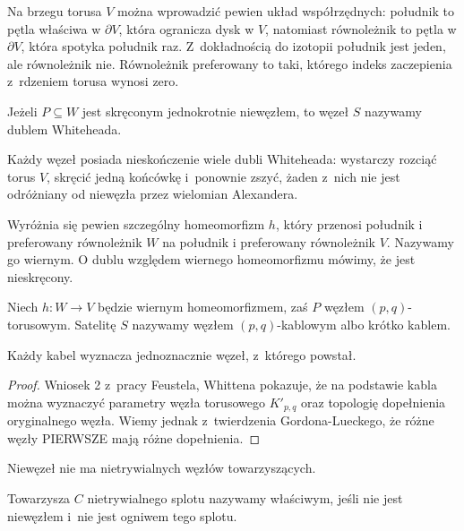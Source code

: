 Na brzegu torusa $V$ można wprowadzić pewien układ współrzędnych: południk to pętla właściwa w $\partial V$, która ogranicza dysk w $V$, natomiast równoleżnik to pętla w $\partial V$, która spotyka południk raz.
Z~dokładnością do izotopii południk jest jeden, ale równoleżnik nie.
Równoleżnik preferowany to taki, którego indeks zaczepienia z~rdzeniem torusa wynosi zero.

\begin{definition}
%
    Jeżeli $P \subseteq W$ jest skręconym jednokrotnie niewęzłem, to węzeł $S$ nazywamy dublem Whiteheada.
\end{definition}

Każdy węzeł posiada nieskończenie wiele dubli Whiteheada: wystarczy rozciąć torus $V$, skręcić jedną końcówkę i~ponownie zszyć, żaden z~nich nie jest odróżniany od niewęzła przez wielomian Alexandera.

Wyróżnia się pewien szczególny homeomorfizm $h$, który przenosi południk i preferowany równoleżnik $W$ na południk i preferowany równoleżnik $V$.
Nazywamy go wiernym.
O dublu względem wiernego homeomorfizmu mówimy, że jest nieskręcony.

\begin{definition}
%
    Niech $h \colon W \to V$ będzie wiernym homeomorfizmem, zaś $P$ węzłem $(p, q)$-torusowym.
    Satelitę $S$ nazywamy węzłem $(p, q)$-kablowym albo krótko kablem.
\end{definition}

\begin{proposition}
    Każdy kabel wyznacza jednoznacznie węzeł, z~którego powstał.
\end{proposition}

\begin{proof}
%
%
    Wniosek 2 z~pracy \cite{feustel78} Feustela, Whittena pokazuje, że na podstawie kabla można wyznaczyć parametry węzła torusowego $K'_{p,q}$ oraz topologię dopełnienia oryginalnego węzła.
    Wiemy jednak z~twierdzenia Gordona-Lueckego, że różne węzły PIERWSZE mają różne dopełnienia.
\end{proof}

Niewęzeł nie ma nietrywialnych węzłów towarzyszących.

\begin{definition}
    Towarzysza $C$ nietrywialnego splotu nazywamy właściwym, jeśli nie jest niewęzłem i~nie jest ogniwem tego splotu.
\end{definition}

